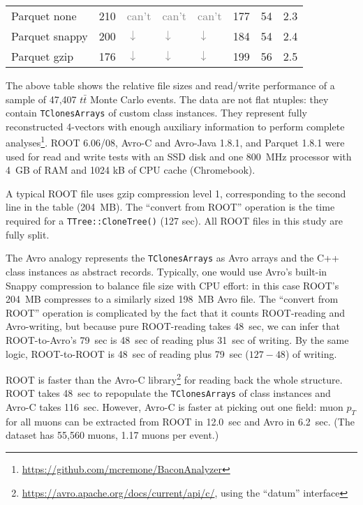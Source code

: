 \documentclass{article}
\begin{document}
\begin{center}
\begin{tabular}{p{2.4 cm} | P{1.2 cm} P{1.9 cm} P{1.2 cm} P{1.8 cm} P{1.9 cm} P{1.2 cm} P{1.8 cm}}
Parquet none  & 210 &        \textcolor{gray}{can't} &        \textcolor{gray}{can't} &        \textcolor{gray}{can't} &          177 &           54 &          2.3 \\
Parquet snappy  & 200 & \textcolor{gray}{$\downarrow$} & \textcolor{gray}{$\downarrow$} & \textcolor{gray}{$\downarrow$} &          184 &           54 &          2.4 \\
Parquet gzip  & 176 & \textcolor{gray}{$\downarrow$} & \textcolor{gray}{$\downarrow$} & \textcolor{gray}{$\downarrow$} &          199 &           56 &          2.5 \\
\end{tabular}
\end{center}

The above table shows the relative file sizes and read/write performance of a sample of 47,407 $t\bar{t}$ Monte Carlo events. The data are not flat ntuples: they contain {\tt TClonesArrays} of custom class instances. They represent fully reconstructed 4-vectors with enough auxiliary information to perform complete analyses\footnote{\url{https://github.com/mcremone/BaconAnalyzer}}. ROOT 6.06/08, Avro-C and Avro-Java 1.8.1, and Parquet 1.8.1 were used for read and write tests with an SSD disk and one 800~MHz processor with 4~GB of RAM and 1024 kB of CPU cache (Chromebook).

A typical ROOT file uses gzip compression level 1, corresponding to the second line in the table (204~MB). The ``convert from ROOT'' operation is the time required for a {\tt TTree::CloneTree()} (127 sec). All ROOT files in this study are fully split.

The Avro analogy represents the {\tt TClonesArrays} as Avro arrays and the C++ class instances as abstract records. Typically, one would use Avro's built-in Snappy compression to balance file size with CPU effort: in this case ROOT's 204~MB compresses to a similarly sized 198~MB Avro file. The ``convert from ROOT'' operation is complicated by the fact that it counts ROOT-reading and Avro-writing, but because pure ROOT-reading takes 48~sec, we can infer that ROOT-to-Avro's 79~sec is 48~sec of reading plus 31~sec of writing. By the same logic, ROOT-to-ROOT is 48~sec of reading plus 79~sec ($127 - 48$) of writing.

ROOT is faster than the Avro-C library\footnote{\url{https://avro.apache.org/docs/current/api/c/}, using the ``datum'' interface} for reading back the whole structure. ROOT takes 48~sec to repopulate the {\tt TClonesArrays} of class instances and Avro-C takes 116~sec. However, Avro-C is faster at picking out one field: muon $p_T$ for all muons can be extracted from ROOT in 12.0~sec and Avro in 6.2~sec. (The dataset has 55,560 muons, 1.17 muons per event.)
\end{document}
